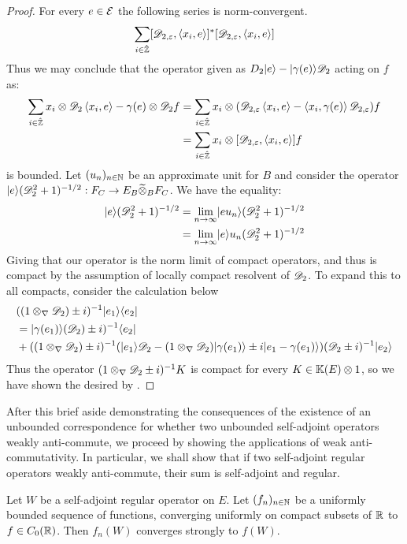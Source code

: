 \begin{proof}
	For every $e\in \mathcal{E}$ the following series is norm-convergent.  
	\begin{align*}
		\sum_{i \in \hat{\mathbb{Z}}}[\mathscr{D}_{2,\varepsilon},\left \langle x_i,e \right \rangle]^*[\mathscr{D}_{2,\varepsilon},\left \langle x_i,e \right \rangle]
	\end{align*}
	Thus we may conclude that the operator given as $D_2\lvert e \rangle-\lvert \gamma(e) \rangle\mathscr{D}_2$ acting on $f$ as:
	\begin{align*}
		\sum_{i\in \hat{\mathbb{Z}}} x_i \otimes \mathscr{D}_2 \left \langle x_i,e \right \rangle-\gamma(e)\otimes \mathscr{D}_2 f&=\sum_{i\in \hat{\mathbb{Z}}} x_i\otimes (\mathscr{D}_{2,\varepsilon}\left \langle x_i,e \right \rangle-\left \langle x_i,\gamma(e) \right \rangle\mathscr{D}_{2,\varepsilon})f \\
		&=\sum_{i\in\hat{\mathbb{Z}}} x_i \otimes[\mathscr{D}_{2,\varepsilon},\left \langle x_i,e \right \rangle]f
	\end{align*}
	is bounded. 
	Let $(u_n)_{n\in \mathbb{N}}$ be an approximate unit for $B$ and consider the operator $\lvert e \rangle(\mathscr{D}_2^2+1)^{-1/2}:F_C\to E_B\widetilde{\otimes}_B F_C$. We have the equality:
	\begin{align*}
		\lvert e \rangle(\mathscr{D}_2^2+1)^{-1/2}&=\lim_{n\to\infty} \lvert e u_n \rangle(\mathscr{D}_2^2+1)^{-1/2} \\
		&=\lim_{n\to \infty}\lvert e \rangle u_n(\mathscr{D}_2^2+1)^{-1/2}
	\end{align*}
	Giving that our operator is the norm limit of compact operators, and thus is compact by the assumption of locally compact resolvent of $\mathscr{D}_2$. To expand this to all compacts, consider the calculation below
	\begin{align*}
		&((1\otimes_\nabla \mathscr{D}_2)\pm i)^{-1} \lvert e_1 \rangle\langle e_2 \rvert \\
		&=\lvert \gamma(e_1) \rangle(\mathscr{D}_2)\pm i)^{-1} \langle e_2 \rvert \\
		&+((1\otimes_\nabla \mathscr{D}_2)\pm i)^{-1}(\lvert e_1 \rangle\mathscr{D}_2-(1\otimes_\nabla \mathscr{D}_2)\lvert \gamma(e_1) \rangle\pm i\lvert e_1-\gamma(e_1) \rangle)(\mathscr{D}_2\pm i)^{-1} \lvert e_2 \rangle
	\end{align*}
Thus the operator $(1\otimes_\nabla \mathscr{D}_2 \pm i)^{-1}K$ is compact for every $K\in \mathbb{K}(E)\otimes 1$, so we have shown the desired by . 
\end{proof}
After this brief aside demonstrating the consequences of the existence of an unbounded correspondence for whether two unbounded self-adjoint operators weakly anti-commute, we proceed by showing the applications of weak anti-commutativity. In particular, we shall show that if two self-adjoint regular operators weakly anti-commute, their sum is self-adjoint and regular. 
\begin{lemma}\label{strongconvsa}
	Let $W$ be a self-adjoint regular operator on $E$. Let $(f_n)_{n\in\mathbb{N}}$ be a uniformly bounded sequence of functions, converging uniformly on compact subsets of $\mathbb{R}$ to $f\in C_0(\mathbb{R})$. 
	Then $f_n(W)$ converges strongly to $f(W)$. 
\end{lemma}
